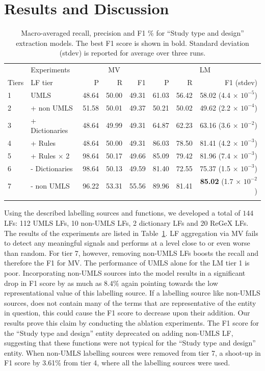 \documentclass{IOS-Book-Article}
\begin{document}
%
%
%
\section{Results and Discussion}
\label{sec:results}
%

%
%
%
\begin{table}[htb]
    \centering
    \begin{tabular}{l|l|r|r|r|r|r|r}
    \Xhline{1pt}
        & Experiments & \multicolumn{3}{c|}{MV} & \multicolumn{3}{c}{LM} \\ \Xhline{1pt}
        Tiers & LF tier & P & R & F1 & P & R & F1 (stdev) \\
        \Xhline{1pt}
        1 & UMLS & 48.64 & 50.00 & 49.31 & 61.03 & 56.42 & 58.02 (4.4 × $10^{-5}$) \\
        2 & + non UMLS & 51.58 & 50.01 & 49.37 & 50.21 & 50.02 & 49.62 (2.2 × $10^{-4}$)\\
        3 & + Dictionaries & 48.64 & 49.99 & 49.31 & 64.87 & 62.23 & 63.16 (3.6 × $10^{-2}$)\\
        4 & + Rules & 48.64 & 50.00 & 49.31 & 86.03 & 78.50 & 81.41 (4.2 × $10^{-3}$)\\
        5 & + Rules $\times$ 2 & 98.64 & 50.17 & 49.66 & 85.09 & 79.42 & 81.96 (7.4 × $10^{-3}$)\\
        6 & - Dictionaries & 98.64 & 50.13 & 49.59 & 81.40 & 72.55 & 75.37 (1.5 × $10^{-3}$)\\
        7 & - non UMLS & 96.22 & 53.31 & 55.56 & 89.96 & 81.41 & \textbf{85.02} (1.7 × $10^{-2}$)\\
    \Xhline{1pt}
    \end{tabular}
    \vspace{1em}
    \caption{\label{tab:res} Macro-averaged recall, precision and F1 \% for ``Study type and design'' extraction models. The best F1 score is shown in bold. Standard deviation (stdev) is reported for average over three runs.}
\end{table}
%
%
%
Using the described labelling sources and functions, we developed a total of $144$ LFs: 112 UMLS LFs, 10 non-UMLS LFs, 2 dictionary LFs and 20 ReGeX LFs. 
The results of the experiments are listed in Table~\ref{tab:res}.
LF aggregation via MV fails to detect any meaningful signals and performs at a level close to or even worse than random.
For tier 7, however, removing non-UMLS LFs boosts the recall and therefore the F1 for MV.
The performance of UMLS alone for the LM tier 1 is poor.
Incorporating non-UMLS sources into the model results in a significant drop in F1 score by as much as $8.4\%$ again pointing towards the low representational value of this labelling source.
If a labelling source like non-UMLS sources, does not contain many of the terms that are representative of the entity in question, this could cause the F1 score to decrease upon their addition.
Our results prove this claim by conducting the ablation experiments.
The F1 score for the ``Study type and design'' entity deprecated on adding non-UMLS LF, suggesting that these functions were not typical for the ``Study type and design'' entity.
When non-UMLS labelling sources were removed from tier 7, a shoot-up in F1 score by 3.61\% from tier 4, where all the labelling sources were used.
\end{document}
